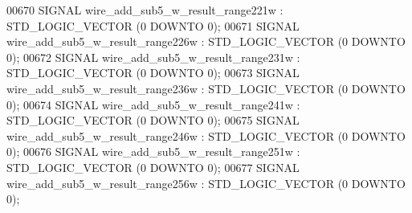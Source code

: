 \begin{DoxyCode}
{00670      \textcolor{keywordflow}{SIGNAL}  \textcolor{vhdlchar}{wire_add_sub5_w_result_range221w}   \textcolor{vhdlchar}{:}   \textcolor{comment}{STD\_LOGIC\_VECTOR} \textcolor{vhdlchar}{(}\textcolor{vhdllogic}{}\textcolor{vhdllogic}{0} \textcolor{keywordflow}{DOWNTO} \textcolor{vhdllogic}{}\textcolor{vhdllogic}{0}\textcolor{vhdlchar}{)};
00671      \textcolor{keywordflow}{SIGNAL}  \textcolor{vhdlchar}{wire_add_sub5_w_result_range226w}   \textcolor{vhdlchar}{:}   \textcolor{comment}{STD\_LOGIC\_VECTOR} \textcolor{vhdlchar}{(}\textcolor{vhdllogic}{}\textcolor{vhdllogic}{0} \textcolor{keywordflow}{DOWNTO} \textcolor{vhdllogic}{}\textcolor{vhdllogic}{0}\textcolor{vhdlchar}{)};
00672      \textcolor{keywordflow}{SIGNAL}  \textcolor{vhdlchar}{wire_add_sub5_w_result_range231w}   \textcolor{vhdlchar}{:}   \textcolor{comment}{STD\_LOGIC\_VECTOR} \textcolor{vhdlchar}{(}\textcolor{vhdllogic}{}\textcolor{vhdllogic}{0} \textcolor{keywordflow}{DOWNTO} \textcolor{vhdllogic}{}\textcolor{vhdllogic}{0}\textcolor{vhdlchar}{)};
00673      \textcolor{keywordflow}{SIGNAL}  \textcolor{vhdlchar}{wire_add_sub5_w_result_range236w}   \textcolor{vhdlchar}{:}   \textcolor{comment}{STD\_LOGIC\_VECTOR} \textcolor{vhdlchar}{(}\textcolor{vhdllogic}{}\textcolor{vhdllogic}{0} \textcolor{keywordflow}{DOWNTO} \textcolor{vhdllogic}{}\textcolor{vhdllogic}{0}\textcolor{vhdlchar}{)};
00674      \textcolor{keywordflow}{SIGNAL}  \textcolor{vhdlchar}{wire_add_sub5_w_result_range241w}   \textcolor{vhdlchar}{:}   \textcolor{comment}{STD\_LOGIC\_VECTOR} \textcolor{vhdlchar}{(}\textcolor{vhdllogic}{}\textcolor{vhdllogic}{0} \textcolor{keywordflow}{DOWNTO} \textcolor{vhdllogic}{}\textcolor{vhdllogic}{0}\textcolor{vhdlchar}{)};
00675      \textcolor{keywordflow}{SIGNAL}  \textcolor{vhdlchar}{wire_add_sub5_w_result_range246w}   \textcolor{vhdlchar}{:}   \textcolor{comment}{STD\_LOGIC\_VECTOR} \textcolor{vhdlchar}{(}\textcolor{vhdllogic}{}\textcolor{vhdllogic}{0} \textcolor{keywordflow}{DOWNTO} \textcolor{vhdllogic}{}\textcolor{vhdllogic}{0}\textcolor{vhdlchar}{)};
00676      \textcolor{keywordflow}{SIGNAL}  \textcolor{vhdlchar}{wire_add_sub5_w_result_range251w}   \textcolor{vhdlchar}{:}   \textcolor{comment}{STD\_LOGIC\_VECTOR} \textcolor{vhdlchar}{(}\textcolor{vhdllogic}{}\textcolor{vhdllogic}{0} \textcolor{keywordflow}{DOWNTO} \textcolor{vhdllogic}{}\textcolor{vhdllogic}{0}\textcolor{vhdlchar}{)};
00677      \textcolor{keywordflow}{SIGNAL}  \textcolor{vhdlchar}{wire_add_sub5_w_result_range256w}   \textcolor{vhdlchar}{:}   \textcolor{comment}{STD\_LOGIC\_VECTOR} \textcolor{vhdlchar}{(}\textcolor{vhdllogic}{}\textcolor{vhdllogic}{0} \textcolor{keywordflow}{DOWNTO} \textcolor{vhdllogic}{}\textcolor{vhdllogic}{0}\textcolor{vhdlchar}{)};
}
\end{DoxyCode}
